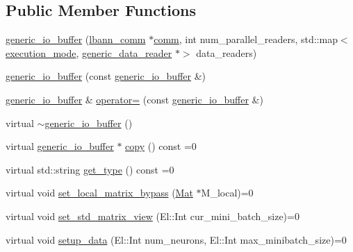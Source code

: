\subsection*{Public Member Functions}
\begin{DoxyCompactItemize}
\item 
\hyperlink{classlbann_1_1generic__io__buffer_a21e2ef867da6fb0fa334d751ae6b692f}{generic\+\_\+io\+\_\+buffer} (\hyperlink{classlbann_1_1lbann__comm}{lbann\+\_\+comm} $\ast$\hyperlink{file__io_8cpp_ab048c6f9fcbcfaa57ce68b00263dbebe}{comm}, int num\+\_\+parallel\+\_\+readers, std\+::map$<$ \hyperlink{base_8hpp_a2781a159088df64ed7d47cc91c4dc0a8}{execution\+\_\+mode}, \hyperlink{classlbann_1_1generic__data__reader}{generic\+\_\+data\+\_\+reader} $\ast$$>$ data\+\_\+readers)
\item 
\hyperlink{classlbann_1_1generic__io__buffer_a0810bd8f8c803aa992e4c29b4eee3506}{generic\+\_\+io\+\_\+buffer} (const \hyperlink{classlbann_1_1generic__io__buffer}{generic\+\_\+io\+\_\+buffer} \&)
\item 
\hyperlink{classlbann_1_1generic__io__buffer}{generic\+\_\+io\+\_\+buffer} \& \hyperlink{classlbann_1_1generic__io__buffer_ae8d2b80e11cf780def151a425a6b1fa0}{operator=} (const \hyperlink{classlbann_1_1generic__io__buffer}{generic\+\_\+io\+\_\+buffer} \&)
\item 
virtual \hyperlink{classlbann_1_1generic__io__buffer_a0b531621374f697db06d8a3feec095cf}{$\sim$generic\+\_\+io\+\_\+buffer} ()
\item 
virtual \hyperlink{classlbann_1_1generic__io__buffer}{generic\+\_\+io\+\_\+buffer} $\ast$ \hyperlink{classlbann_1_1generic__io__buffer_a9d8020b82cf467c9148b0b37e7229262}{copy} () const =0
\item 
virtual std\+::string \hyperlink{classlbann_1_1generic__io__buffer_adc77c0a280f8a200a8d8495c3a371ebb}{get\+\_\+type} () const =0
\item 
virtual void \hyperlink{classlbann_1_1generic__io__buffer_af84c26ab5ee77d1d9ed9ea5d62823815}{set\+\_\+local\+\_\+matrix\+\_\+bypass} (\hyperlink{base_8hpp_a68f11fdc31b62516cb310831bbe54d73}{Mat} $\ast$M\+\_\+local)=0
\item 
virtual void \hyperlink{classlbann_1_1generic__io__buffer_a458d9bf722effce4177a0ac0aee9124f}{set\+\_\+std\+\_\+matrix\+\_\+view} (El\+::\+Int cur\+\_\+mini\+\_\+batch\+\_\+size)=0
\item 
virtual void \hyperlink{classlbann_1_1generic__io__buffer_a00f3920147f7f19eceb5336bd6ddb421}{setup\+\_\+data} (El\+::\+Int num\+\_\+neurons, El\+::\+Int max\+\_\+minibatch\+\_\+size)=0
$$
\end{DoxyCompactItemize}
